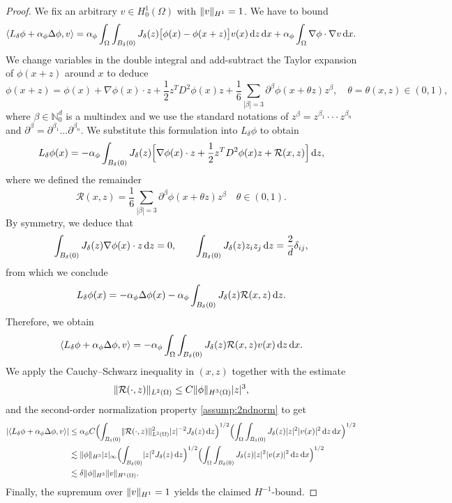 \documentclass[]{article}
\newcommand{\dz}{\,\textup{d}z}
\newcommand{\dx}{\,\textup{d}x}
\DeclarePairedDelimiter{\abs}{\lvert}{\rvert}
\DeclarePairedDelimiter{\norm}{\lVert}{\rVert}
\begin{document}
\begin{proof}
	We fix an arbitrary $v\in H_0^1(\Omega)$ with $\norm{v}_{H^1}=1$.  We have to bound
	\[
	\langle L_\delta\phi + \alpha_\phi\Delta\phi,v\rangle
	= \alpha_\phi\int_\Omega\int_{B_\delta(0)}
	J_\delta(z)\bigl[\phi(x)-\phi(x+z)\bigr]v(x)\dz\dx
	+\alpha_\phi\int_\Omega\nabla\phi\cdot\nabla v\dx.
	\]
	We change variables in the double integral and add-subtract the Taylor expansion of $\phi(x+z)$ around $x$ to deduce
	\[
	\phi(x+z)=\phi(x)+\nabla\phi(x)\cdot z+\frac12z^TD^2\phi(x)z
	+\frac16\sum_{|\beta|=3}\partial^\beta\phi(x+\theta z)z^\beta, \quad \theta=\theta(x,z)\in(0,1),
	\]
	where $\beta \in \mathbb{N}_0^d$ is a multindex and we use the standard notations of $z^\beta=z^{\beta_1}\cdot \cdot \cdot z^{\beta_n}$ and $\partial^\beta=\partial^{\beta_1} \dots \partial^{\beta_n}$.
	We substitute this formulation into $L_\delta\phi$ to obtain
	\[
	L_\delta\phi(x)
	=-\alpha_\phi\int_{B_\delta(0)} J_\delta(z)\Bigl[\nabla\phi(x)\cdot z
	+\frac12z^TD^2\phi(x)z
	+\mathcal R(x,z)\Bigr]\dz,
	\]
	where we defined the remainder
	\[
	\mathcal R(x,z)
	=\frac16\sum_{|\beta|=3}\partial^\beta\phi(x+\theta z)z^\beta \quad \theta \in (0,1).
	\]
	By symmetry, we deduce that
	\[
	\int_{B_\delta(0)} J_\delta(z)\nabla\phi(x)\cdot z\dz=0,
	\qquad
	\int_{B_\delta(0)} J_\delta(z)z_i z_j\dz=\frac2d\delta_{ij},
	\]
	from which we conclude
	\[
	L_\delta\phi(x)
	=-\alpha_\phi\Delta\phi(x)
	-
	\alpha_\phi\int_{B_\delta(0)} J_\delta(z)\mathcal R(x,z)\dz.
	\]
	Therefore, we obtain
	\[
	\langle L_\delta\phi + \alpha_\phi\Delta\phi,v\rangle
	= -\alpha_\phi\int_{\Omega}\int_{B_\delta(0)}
	J_\delta(z)\mathcal R(x,z)v(x)\dz\dx.
	\]
	We apply the Cauchy--Schwarz inequality in $(x,z)$ together with the estimate
	\[
	\norm{\mathcal R(\cdot ,z)}_{L^2(\Omega)}\le C\norm{\phi}_{H^3(\Omega)}\abs{z}^3,
	\]
	and the second-order normalization property \eqref{assump:2ndnorm} to get
	\[
	\begin{aligned}
		\abs{\langle L_\delta\phi + \alpha_\phi\Delta\phi,v\rangle}
		&\le\alpha_\phi C 
		\Bigl(\int_{B_\delta(0)} \norm{\mathcal R(\cdot ,z)}_{L^2(\Omega)}^2 \abs{z}^{-2} J_\delta(z)\dz\Bigr)^{1/2}
		\Bigl(\int_\Omega\int_{B_\delta(0)} J_\delta(z)\abs{z}^2|v(x)|^2\dz\dx\Bigr)^{1/2}
		\\
		&\lesssim \norm{\phi}_{H^3} \abs{z}_\infty 
		\Bigl(\int_{B_\delta(0)} \abs{z}^{2} J_\delta(z)\dz\Bigr)^{1/2}
		\Bigl(\int_\Omega\int_{B_\delta(0)} J_\delta(z)\abs{z}^2|v(x)|^2\dz\dx\Bigr)^{1/2}
		\\ &\lesssim \delta\norm{\phi}_{H^3}\norm{v}_{H^1(\Omega)}.
	\end{aligned}
	\]
	Finally, the supremum over $\norm{v}_{H^1}=1$ yields the claimed $H^{-1}$-bound.
\end{proof}
\end{document}
